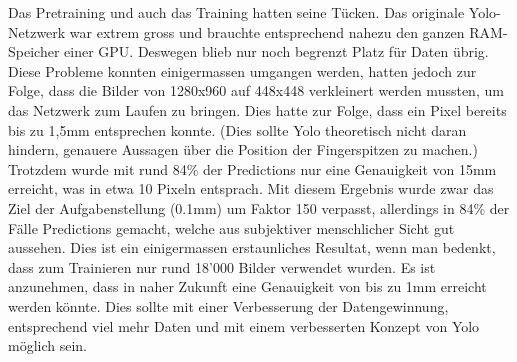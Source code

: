 Das Pretraining und auch das Training hatten seine Tücken.
Das originale Yolo-Netzwerk war extrem gross und brauchte entsprechend nahezu den ganzen RAM-Speicher einer GPU.
Deswegen blieb nur noch begrenzt Platz für Daten übrig. 
Diese Probleme konnten einigermassen umgangen werden, hatten jedoch zur Folge, dass die Bilder von 1280x960 auf 448x448 verkleinert werden mussten, um das Netzwerk zum Laufen zu bringen. 
Dies hatte zur Folge, dass ein Pixel bereits bis zu 1,5mm entsprechen konnte. (Dies sollte Yolo theoretisch nicht daran hindern, genauere Aussagen über die Position der Fingerspitzen zu machen.) 
Trotzdem wurde mit rund 84\% der Predictions nur eine Genauigkeit von 15mm erreicht, was in etwa 10 Pixeln entsprach. 
Mit diesem Ergebnis wurde zwar das Ziel der Aufgabenstellung (0.1mm) um Faktor 150 verpasst, allerdings in 84\% der Fälle Predictions gemacht, welche aus subjektiver menschlicher Sicht \grqq{}gut\grqq{} aussehen. 
Dies ist ein einigermassen erstaunliches Resultat, wenn man bedenkt, dass zum Trainieren nur rund 18'000 Bilder verwendet wurden. 
Es ist anzunehmen, dass in naher Zukunft eine Genauigkeit von bis zu 1mm erreicht werden könnte. 
Dies sollte mit einer Verbesserung der Datengewinnung, entsprechend viel mehr Daten und mit einem verbesserten Konzept von Yolo möglich sein.

